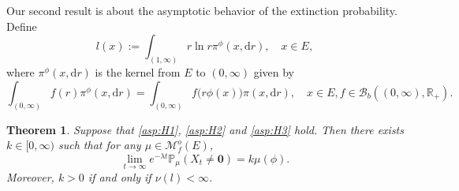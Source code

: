 \documentclass[12pt,a4paper]{amsart}
\numberwithin{equation}{section}
\theoremstyle{plain}
\newtheorem{thm}{Theorem}[section]
\theoremstyle{definition}
\theoremstyle{remark}
\begin{document}
	Our second result is about the asymptotic behavior of the extinction probability. 
	Define 
\begin{equation} 
	l(x)
	:= \int_{(1,\infty)} r\ln r\pi^\phi(x, {\mathrm d}r),\quad x \in E,%
\end{equation}
	where $\pi^\phi(x, \mathrm dr)$ is the kernel from $E$ to $(0,\infty)$ given by
\begin{equation} 
	\int_{(0,\infty)} f(r)\pi^\phi(x,{\mathrm d}r)
	=\int_{(0,\infty)} f\big(r\phi(x)\big)\pi(x, {\mathrm d}r),
	\quad x\in E, f\in\mathcal B_b((0,\infty),\mathbb R_+).
\end{equation}

\begin{thm} \label{thm:E}
	Suppose that \eqref{asp:H1}, \eqref{asp:H2} and \eqref{asp:H3} hold.	
	Then there exists $k\in [0,\infty)$ such that for any $\mu \in \mathcal M_f^o(E)$,
\begin{equation}
	\lim_{t\rightarrow\infty} e^{-\lambda t}\mathbb P_\mu(X_t \neq \mathbf 0)
	=k\mu(\phi). 
\end{equation}
	Moreover, $k>0$ if and only if $\nu(l)<\infty$.
\end{thm}
\end{document}
